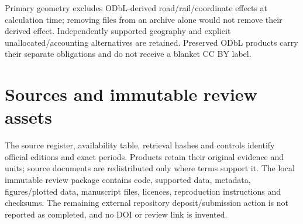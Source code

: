 Primary geometry excludes ODbL-derived road/rail/coordinate effects at calculation time; removing files from an archive alone would not remove their derived effect. Independently supported geography and explicit unallocated/accounting alternatives are retained. Preserved ODbL products carry their separate obligations and do not receive a blanket CC BY label.

\section{Sources and immutable review assets}\label{app:sources}
The source register, availability table, retrieval hashes and controls identify official editions and exact periods. Products retain their original evidence and units; source documents are redistributed only where terms support it. The local immutable review package contains code, supported data, metadata, figures/plotted data, manuscript files, licences, reproduction instructions and checksums. The remaining external repository deposit/submission action is not reported as completed, and no DOI or review link is invented.

